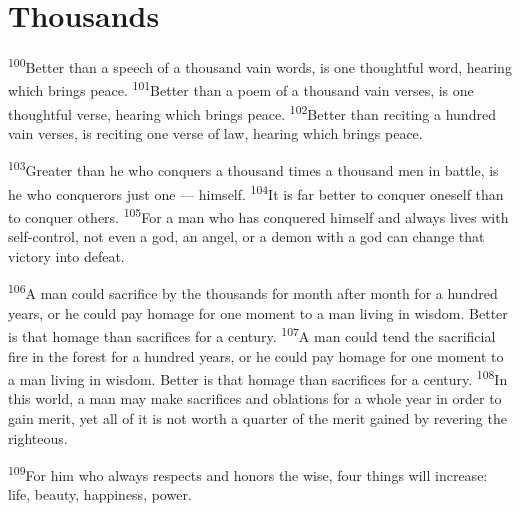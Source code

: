\documentclass[openany,12pt,english]{book}
\newenvironment{para}{\par\pretolerance=100\tolerance=200\setlength{\emergencystretch}{0.6em}\relax}{\par}
\begin{document}
\section*{Thousands}
\begin{para}
    \textsuperscript{100}\thinspace{}Bet\-ter than a speech of a thou\-sand vain words, is one thought\-ful word, hear\-ing which brings peace.
    \textsuperscript{101}\thinspace{}Bet\-ter than a po\-em of a thou\-sand vain verses, is one thought\-ful verse, hear\-ing which brings peace.
    \textsuperscript{102}\thinspace{}Bet\-ter than re\-cit\-ing a hun\-dred vain verses, is re\-cit\-ing one verse of law, hear\-ing which brings peace.
\end{para}

\begin{para}
    \textsuperscript{103}\thinspace{}Greater than he who conquers a thou\-sand times a thou\-sand men in bat\-tle, is he who conquerors just one --- him\-self.
    \textsuperscript{104}\thinspace{}It is far bet\-ter to con\-quer one\-self than to con\-quer others.
    \textsuperscript{105}\thinspace{}For a man who has conquered him\-self and al\-ways lives with self-control, not e\-ven a god, an an\-gel, or a de\-mon with a god can change that vic\-to\-ry in\-to de\-feat.
\end{para}

\begin{para}
    \textsuperscript{106}\thinspace{}A man could sac\-ri\-fice by the thousands for month af\-ter month for a hun\-dred years, or he could pay hom\-age for one mo\-ment to a man liv\-ing in wis\-dom. Bet\-ter is that hom\-age than sacrifices for a cen\-tu\-ry.
    \textsuperscript{107}\thinspace{}A man could tend the sac\-ri\-fi\-cial fire in the for\-est for a hun\-dred years, or he could pay hom\-age for one mo\-ment to a man liv\-ing in wis\-dom. Bet\-ter is that hom\-age than sacrifices for a cen\-tu\-ry.
    \textsuperscript{108}\thinspace{}In this world, a man may make sacrifices and oblations for a whole year in or\-der to gain mer\-it, yet all of it is not worth a quar\-ter of the mer\-it gained by re\-ver\-ing the right\-eous.
\end{para}

\begin{para}
    \textsuperscript{109}\thinspace{}For him who al\-ways respects and hon\-ors the wise, four things will in\-crease: life, beau\-ty, hap\-pi\-ness, pow\-er.
\end{para}
\end{document}
